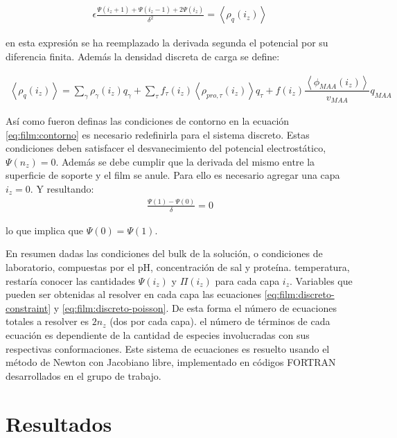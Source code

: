 \begin{align}
	\epsilon \frac{\Psi(i_z +1) + \Psi(i_z -1) +2\Psi(i_z)}{\delta^2} = \left< \rho_q(i_z)\right>
	\label{eq:film:discreto-poisson}
\end{align}

\noindent en esta expresi\'on se ha reemplazado la derivada segunda el potencial por su diferencia finita. Adem\'as la densidad discreta de carga se define:


\begin{align}
	\left<\rho_q(i_z)\right> = \sum_{\gamma } {\rho_\gamma(i_z) q_\gamma + \sum_\tau{f_\tau(i_z) \left<\rho_{pro,\tau}(i_z)\right> q_\tau} +  f(i_z)\dfrac{\left<\phi_{MAA}(i_z)\right>}{v_{MAA}}q_{MAA}}
	\label{eq:film:rho_charge-discreto}
\end{align}


As\'i como fueron definas las condiciones de contorno en la ecuaci\'on \ref{eq:film:contorno} es necesario redefinirla para el sistema discreto. Estas condiciones deben satisfacer el desvanecimiento del potencial electrost\'atico, $\Psi(n_z) =0 $. Adem\'as se debe cumplir que la derivada del mismo entre la superficie de soporte y el film se anule.
Para ello es necesario agregar una capa $i_z = 0$.
Y resultando:
\begin{align}
	\frac{\Psi(1) - \Psi(0)}{\delta} = 0
\end{align}

\noindent lo que implica que $\Psi(0) =  \Psi(1)$.

En resumen dadas las condiciones del bulk de la soluci\'on, o condiciones de laboratorio, compuestas por el pH, concentraci\'on de sal y prote\'ina. temperatura, restar\'ia conocer las cantidades $\Psi(i_z)$ y $\Pi(i_z)$ para cada capa $i_z$. Variables que pueden ser obtenidas al resolver en cada capa las ecuaciones \ref{eq:film:discreto-constraint} y \ref{eq:film:discreto-poisson}.
De esta forma el n\'umero de ecuaciones totales a resolver es $2n_z$ (dos por cada capa). el n\'umero de t\'erminos de cada ecuaci\'on es dependiente de la cantidad de especies involucradas con sus respectivas conformaciones. 
Este sistema de ecuaciones es resuelto usando el m\'etodo de Newton con Jacobiano libre, implementado en c\'odigos FORTRAN desarrollados en el grupo de trabajo.

\section{Resultados} \label{sec:film:resultados}


